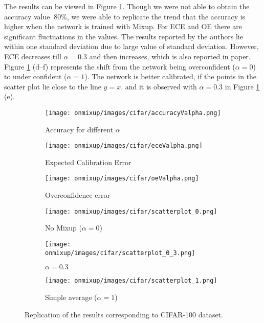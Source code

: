 \documentclass{article}
\begin{document}
The results can be viewed in Figure \ref{fig:cifar100}. Though we were not able to obtain the accuracy value $~80\%$, we were able to replicate the trend that the accuracy is higher when the network is trained with Mixup. For ECE and OE there are significant fluctuations in the values. The results reported by the authors lie within one standard deviation due to large value of standard deviation. However, ECE decreases till $\alpha=0.3$ and then increases, which is also reported in paper. Figure \ref{fig:cifar100} (d--f) represents the shift from the network being overconfident ($\alpha=0$) to under confident ($\alpha=1$). The network is better calibrated, if the points in the scatter plot lie close to the line $y=x$, and it is observed with $\alpha=0.3$ in Figure \ref{fig:cifar100} (e).
\begin{figure}[h]
     \centering
     \begin{subfigure}[b]{0.31\textwidth}
         \centering
         \texttt{[image: onmixup/images/cifar/accuracyValpha.png]}
         \caption{Accuracy for different $\alpha$}
     \end{subfigure}
     \begin{subfigure}[b]{0.31\textwidth}
         \centering
         \texttt{[image: onmixup/images/cifar/eceValpha.png]}
         \caption{Expected Calibration Error}
     \end{subfigure}
     \begin{subfigure}[b]{0.31\textwidth}
         \centering
         \texttt{[image: onmixup/images/cifar/oeValpha.png]}
         \caption{Overconfidence error}
     \end{subfigure}
     \begin{subfigure}[b]{0.31\textwidth}
         \centering
         \noindent\texttt{[image: onmixup/images/cifar/scatterplot\_0.png]}
         \caption{No Mixup ($\alpha=0$)}
     \end{subfigure}
     \begin{subfigure}[b]{0.31\textwidth}
         \centering
         \noindent\texttt{[image: onmixup/images/cifar/scatterplot\_0\_3.png]}
         \caption{$\alpha=0.3$}
     \end{subfigure}
     \begin{subfigure}[b]{0.31\textwidth}
         \centering
         \noindent\texttt{[image: onmixup/images/cifar/scatterplot\_1.png]}
         \caption{Simple average ($\alpha=1$)}
     \end{subfigure}
        \caption{Replication of the results corresponding to CIFAR-100 dataset.}
        \label{fig:cifar100}
\end{figure}
\end{document}
